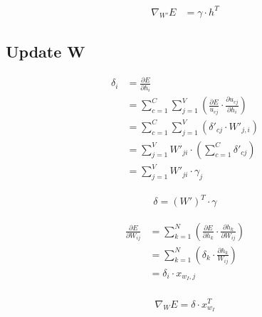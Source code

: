 \documentclass{article}
\begin{document}
	\begin{equation}
		\begin{aligned}
			\nabla_{W'} E &= \gamma \cdot h^T
		\end{aligned}	
	\end{equation}
	
	\subsection{Update W}
	\begin{equation}
		\begin{aligned}
			\delta_i &= \frac{\partial E}{\partial h_i} \\
			&= \sum_{c=1}^{C}\sum_{j=1}^{V} \left( \frac{\partial E}{u_{cj}} \cdot \frac{\partial u_{cj}}{\partial h_i}\right)  \\
			&= \sum_{c=1}^{C}\sum_{j=1}^{V}\left( \delta'_{cj}\cdot W'_{j,i} \right)   \\
			&= \sum_{j=1}^{V} W'_{ji} \cdot \left(\sum_{c=1}^{C} \delta'_{cj} \right) \\
			&= \sum_{j=1}^{V} W'_{ji} \cdot \gamma_j
		\end{aligned}
	\end{equation}
	
	\begin{equation}
		\begin{aligned}
			\delta = (W')^T \cdot \gamma
		\end{aligned}
	\end{equation}
	
	\begin{equation}
		\begin{aligned}
			\frac{\partial E}{\partial W_{ij}} &= \sum_{k=1}^{N} \left( \frac{\partial E}{\partial h_k} \cdot \frac{\partial h_k}{\partial W_{ij}}\right) \\
			&= \sum_{k=1}^{N} \left( \delta_k \cdot \frac{\partial h_k}{W_{ij}}\right) \\
			&= \delta_i \cdot x_{w_I,j} \\
		\end{aligned}
	\end{equation}
	
	
	\begin{equation}
		\begin{aligned}
			\nabla_W E = \delta \cdot x_{w_I}^T
		\end{aligned}
	\end{equation}
\end{document}
